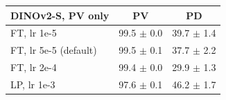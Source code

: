 \begin{tabular}{lcc}\toprule
DINOv2-S, PV only & PV & PD \\\midrule
FT, lr 1e-5 & 99.5 $\pm$ 0.0 & 39.7 $\pm$ 1.4 \\
FT, lr 5e-5 (default) & 99.5 $\pm$ 0.1 & 37.7 $\pm$ 2.2 \\
FT, lr 2e-4 & 99.4 $\pm$ 0.0 & 29.9 $\pm$ 1.3 \\
LP, lr 1e-3 & 97.6 $\pm$ 0.1 & 46.2 $\pm$ 1.7 \\
\bottomrule\end{tabular}
